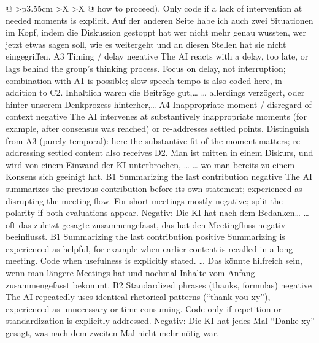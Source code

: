 \begin{xltabular}{\textwidth}{@{}
      >{\RaggedRight\arraybackslash}p{3.55cm}
      >{\RaggedRight\arraybackslash}X
      >{\RaggedRight\arraybackslash}X
    @{}}
{      how to proceed).}
      {Only code if a lack of intervention at needed moments is explicit.}
      {Auf der anderen Seite habe ich auch zwei Situationen im Kopf, indem die
      Diskussion gestoppt hat wer nicht mehr genau wussten, wer jetzt etwas sagen
      soll, wie es weitergeht und an diesen Stellen hat sie nicht eingegriffen.}
    \cbgap
    \cbrow
      {A3}
      {Timing / delay}
      {negative}
      {The AI reacts with a delay, too late, or lags behind the group's thinking
      process.}
      {Focus on delay, not interruption; combination with A1 is possible; slow
      speech tempo is also coded here, in addition to C2.}
      {Inhaltlich waren die Beiträge gut,… … allerdings verzögert, oder hinter
      unserem Denkprozess hinterher,…}
    \cbgap
    \cbrow
      {A4}
      {Inappropriate moment / disregard of context}
      {negative}
      {The AI intervenes at substantively inappropriate moments (for example, after
      consensus was reached) or re-addresses settled points.}
      {Distinguish from A3 (purely temporal): here the substantive fit of the moment
      matters; re-addressing settled content also receives D2.}
      {Man ist mitten in einem Diskurs, und wird von einem Einwand der KI
      unterbrochen, … … wo man bereits zu einem Konsens sich geeinigt hat.}
    \cbcatbreak
    \cbrow
      {B1}
      {Summarizing the last contribution}
      {negative}
      {The AI summarizes the previous contribution before its own statement;
      experienced as disrupting the meeting flow.}
      {For short meetings mostly negative; split the polarity if both evaluations
      appear.}
      {Negativ: Die KI hat nach dem Bedanken… … oft das zuletzt gesagte
      zusammengefasst, das hat den Meetingfluss negativ beeinflusst.}
    \cbgap
    \cbrow
      {B1}
      {Summarizing the last contribution}
      {positive}
      {Summarizing is experienced as helpful, for example when earlier content is
      recalled in a long meeting.}
      {Code when usefulness is explicitly stated.}
      {… Das könnte hilfreich sein, wenn man längere Meetings hat und nochmal
      Inhalte vom Anfang zusammengefasst bekommt.}
    \cbgap
    \cbrow
      {B2}
      {Standardized phrases (thanks, formulas)}
      {negative}
      {The AI repeatedly uses identical rhetorical patterns
      (\enquote{thank you xy}), experienced as unnecessary or time-consuming.}
      {Code only if repetition or standardization is explicitly addressed.}
      {Negativ: Die KI hat jedes Mal \enquote{Danke xy} gesagt, was nach dem zweiten
      Mal nicht mehr nötig war.}

\end{xltabular}

